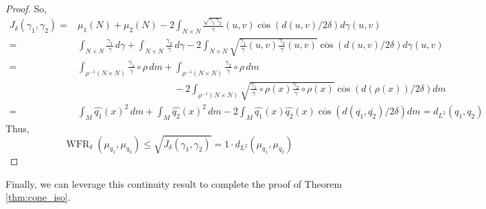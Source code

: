 \documentclass[final,hidelinks,onefignum,onetabnum]{siamart220329}
\newcommand{\WFR}{\operatorname{WFR}}
\begin{document}
\begin{proof}
So,
\begin{align*}
    J_\delta(\gamma_1,\gamma_2)=&\mu_1(N)+\mu_2(N)-2\int_{N\times N}\frac{\sqrt{\gamma_1\gamma_2}}{\gamma}(u,v) \overline{\cos}(d(u,v)/2\delta) d\gamma(u,v)\\
    =&\int_{N\times N}\frac{\gamma_1}{\gamma}\,d\gamma+\int_{N\times N}\frac{\gamma_2}{\gamma}\,d\gamma-2\int_{N\times N}\sqrt{\frac{\gamma_1}{\gamma}(u,v)\frac{\gamma_2}{\gamma}(u,v)} \overline{\cos}(d(u,v)/2\delta) d\gamma(u,v)\\
    =&\int_{\rho^{-1}(N\times N)}\frac{\gamma_1}{\gamma}\circ\rho\,dm+\int_{\rho^{-1}(N\times N)}\frac{\gamma_2}{\gamma}\circ\rho\,dm\\
    &\qquad\qquad\qquad\qquad\qquad-2\int_{\rho^{-1}(N\times N)}\sqrt{\frac{\gamma_1}{\gamma}\circ\rho(x)\frac{\gamma_2}{\gamma}\circ\rho(x)} \overline{\cos}(d(\rho(x))/2\delta) dm\\
    =&\int_{M}\hat{q_1}(x)^2\,dm+\int_{M}\hat{q_2}(x)^2\,dm-2\int_{M}\hat{q_1}(x)\hat{q_2}(x) \overline{\cos}(d(\overline{q_1},\overline{q_2})/2\delta) dm = d_{L^2}(q_1,q_2)
\end{align*}
Thus, \[\WFR_\delta(\mu_{q_1},\mu_{q_2})\leq \sqrt{J_\delta(\gamma_1,\gamma_2)}= 1 \cdot d_{L^2}(\mu_{q_1},\mu_{q_2})\]
\end{proof}
\noindent Finally, we can leverage this continuity result to complete the proof of Theorem \ref{thm:cone_iso}.\\
\end{document}
